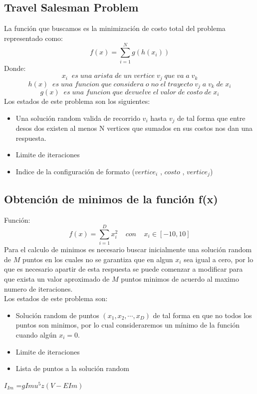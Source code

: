 \documentclass[10pt]{article}
\begin{document}
\subsection{Travel Salesman Problem}
La función que buscamos es la minimización de costo total del problema representado como:
\[f(x)=\sum_{i=1}^{N}g\left(h\left(x_{i}\right)\right)\]
Donde:
\[x_{i}\;\;es\;una\;arista\;de\;un\;vertice\;v_{j}\;que\;va\;a\;v_{k}\]
\[h(x)\;\;es\;una\;funcion\;que\;considera\;o\;no\;el\;trayecto\;v_{j}\;a\;v_{k}\;de\;x_{i}\]
\[g(x)\;\;es\;una\;funcion\;que\;devuelve\;el\;valor\;de\;costo\;de\;x_{i}\]
Los estados de este problema son los siguientes:
\begin{itemize}
  \item Una solución random valida de recorrido $v_{i}$ hasta $v_{j}$ de tal forma que entre desos dos existen al menos N vertices que sumados en sus costos nos dan una respuesta.
  \item Limite de iteraciones
  \item Indice de la configuración de formato ($vertice_{i}$ , $costo$ , $vertice_{j}$)
\end{itemize}
\subsection{Obtención de minimos de la función f(x)}
Función:
\[f(x)=\sum_{i=1}^{D}x_{i}^2\;\;\;\;con\;\;\;\;x_{i}\in[-10,10]\]
Para el calculo de minimos es necesario buscar inicialmente una solución random de $M$ puntos en los cuales no se garantiza que en algun $x_{i}$ sea igual a cero, por lo que es necesario apartir de esta respuesta se puede comenzar a modificar para que exista un valor aproximado de $M$ puntos minimos de acuerdo al maximo numero de iteraciones.\\
Los estados de este problema son:
\begin{itemize}
  \item Solución random de puntos $(x_{1},x_{2},\cdots,x_{D})$ de tal forma en que no todos los puntos son minimos, por lo cual consideraremos un mínimo de la función cuando algún $x_{i}=0$.
  \item Limite de iteraciones
  \item Lista de puntos a la solución random
\end{itemize}
$I_{Im}$ = ​${{g}}{Im}u^{5}z(V - E{Im})$
\end{document}
